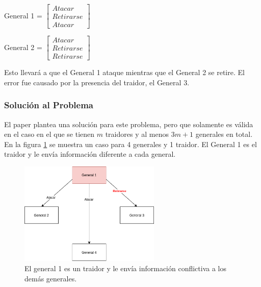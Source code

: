 \begin{flushleft}
    General 1 = $\begin{bmatrix}
        Atacar\\
        Retirarse\\
        Atacar
    \end{bmatrix}$
\end{flushleft}

\begin{flushleft}
    General 2 = $\begin{bmatrix}
        Atacar\\
        Retirarse\\
        Retirarse
    \end{bmatrix}$
\end{flushleft}

Esto llevará a que el General 1 ataque mientras que el General 2 se retire. El error fue causado por la presencia del traidor, el General 3.

\subsubsection{Solución al Problema}

El paper plantea una solución para este problema, pero que solamente es válida en el caso en el que se tienen $m$ traidores y al menos $3m + 1$ generales en total. En la figura \ref{fig:Byzantine_Generals_Problem_2} se muestra un caso para 4 generales y 1 traidor. El General 1 es el traidor y le envía información diferente a cada general.

\begin{figure}[H]
    \centering
    \includegraphics[width=0.6\textwidth]{img/Byzantine_Generals_Problem_2.png}
    \caption{El general 1 es un traidor y le envía información conflictiva a los demás generales.}
    \label{fig:Byzantine_Generals_Problem_2}
\end{figure}

